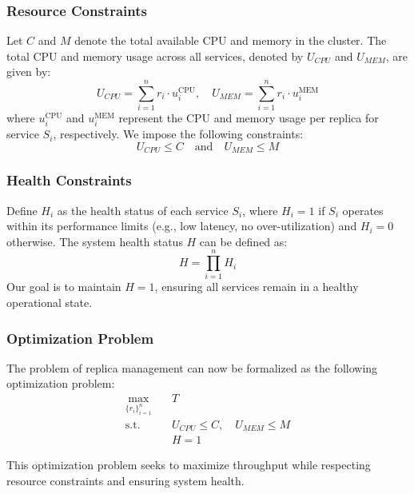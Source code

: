 \documentclass[conference]{IEEEtran}
\begin{document}
\subsubsection{Resource Constraints}

Let $\mathit{C}$ and $\mathit{M}$ denote the total available CPU and memory in the cluster. The total CPU and memory usage across all services, denoted by $\mathit{U_{CPU}}$ and $\mathit{U_{MEM}}$, are given by:
\begin{equation}
    U_{CPU} = \sum_{i=1}^{n} r_i \cdot u_i^{\text{CPU}}, \quad U_{MEM} = \sum_{i=1}^{n} r_i \cdot u_i^{\text{MEM}}
\end{equation}
where $u_i^{\text{CPU}}$ and $u_i^{\text{MEM}}$ represent the CPU and memory usage per replica for service $S_i$, respectively. We impose the following constraints:
\begin{equation}
    U_{CPU} \leq C \quad \text{and} \quad U_{MEM} \leq M
\end{equation}

\subsubsection{Health Constraints}

Define $\mathit{H_i}$ as the health status of each service $S_i$, where $\mathit{H_i} = 1$ if $S_i$ operates within its performance limits (e.g., low latency, no over-utilization) and $\mathit{H_i} = 0$ otherwise. The system health status $\mathit{H}$ can be defined as:
\begin{equation}
    H = \prod_{i=1}^{n} H_i
\end{equation}
Our goal is to maintain $H = 1$, ensuring all services remain in a healthy operational state.

\subsubsection{Optimization Problem}

The problem of replica management can now be formalized as the following optimization problem:
\begin{align}
    \max_{\{r_i\}_{i=1}^{n}} & \quad T \\
    \text{s.t.} & \quad U_{CPU} \leq C, \quad U_{MEM} \leq M \\
    & \quad H = 1
\end{align}

This optimization problem seeks to maximize throughput while respecting resource constraints and ensuring system health.
\end{document}
